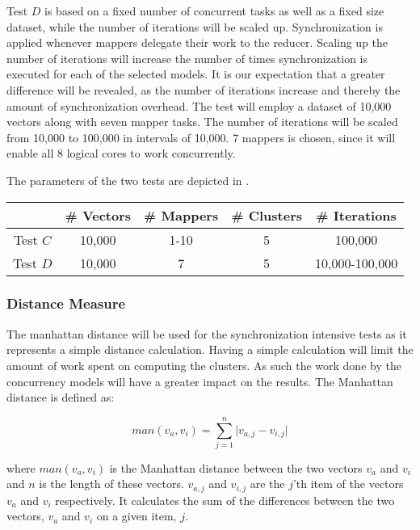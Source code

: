 Test $D$ is based on a fixed number of concurrent tasks as well as a fixed size dataset, while the number of iterations will be scaled up. Synchronization is applied whenever mappers delegate their work to the reducer. Scaling up the number of iterations will increase the number of times synchronization is executed for each of the selected models. It is our expectation that a greater difference will be revealed, as the number of iterations increase and thereby the amount of synchronization overhead. The test will employ a dataset of 10,000 vectors along with seven mapper tasks. The number of iterations will be scaled from 10,000 to 100,000 in intervals of 10,000. 7 mappers is chosen, since it will enable all 8 logical cores to work concurrently.

The parameters of the two tests are depicted in .

\begin{center}
\begin{table}[h]
\centering
\begin{tabular}{c|cccc}
       & \# Vectors        & \# Mappers			 	& \# Clusters & \# Iterations \\ \hline
Test $C$ & 10,000            & 1-10        			& 5           & 100,000      \\
Test $D$ & 10,000			 & 7          			& 5           & 10,000-100,000
\end{tabular}
\end{table}
 \label{tab:test_description} 
\end{center}

\subsubsection{Distance Measure}
The manhattan distance will be used for the synchronization intensive tests as it represents a simple distance calculation. Having a simple calculation will limit the amount of work spent on computing the clusters. As such the work done by the concurrency models will have a greater impact on the results. The Manhattan distance is defined as\cite[p. 41]{amatriain2011data}:
 
\begin{equation}\label{eq:mandistance}
man(v_a,v_i)=\sum_{j=1}^{n}\lvert v_{a,j}-v_{i,j}\rvert
\end{equation}

where $man(v_a,v_i)$ is the Manhattan distance between the two vectors $v_a$ and $v_i$ and $n$ is the length of these vectors. $v_{a,j}$ and $v_{i,j}$ are the $j$'th item of the vectors $v_a$ and $v_i$ respectively. It calculates the sum of the differences between the two vectors, $v_{a}$ and $v_{i}$ on a given item, $j$.


